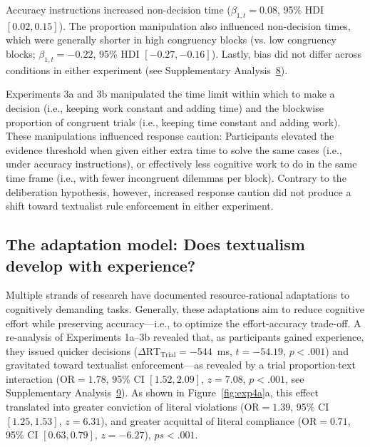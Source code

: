 \documentclass[pdflatex,sn-nature]{sn-jnl}
\begin{document}
Accuracy instructions increased non-decision time ($\beta_{1,t} = 0.08$, 95\% HDI $[0.02, 0.15]$). The proportion manipulation also influenced non-decision times, which were generally shorter in high congruency blocks (vs. low congruency blocks; $\beta_{1,t} = -0.22$, 95\% HDI $[-0.27, -0.16]$). Lastly, bias did not differ across conditions in either experiment (see Supplementary Analysis~\hyperref[supp:analysis8]{8}).

Experiments 3a and 3b manipulated the time limit within which to make a decision (i.e., keeping work constant and adding time) and the blockwise proportion of congruent trials (i.e., keeping time constant and adding work). These manipulations influenced response caution: Participants elevated the evidence threshold when given either extra time to solve the same cases (i.e., under accuracy instructions), or effectively less cognitive work to do in the same time frame (i.e., with fewer incongruent dilemmas per block). Contrary to the deliberation hypothesis, however, increased response caution did not produce a shift toward textualist rule enforcement in either experiment.

\subsection{The adaptation model: Does textualism develop with experience?}\label{subsec:adaptation}

Multiple strands of research have documented resource-rational adaptations to cognitively demanding tasks\cite{ref20,ref21,ref22}. Generally, these adaptations aim to reduce cognitive effort while preserving accuracy---i.e., to optimize the effort-accuracy trade-off. A re-analysis of Experiments 1a--3b revealed that, as participants gained experience, they issued quicker decisions ($\Delta\mathrm{RT_{Trial}} = -544$~ms, $t = -54.19$, $p < .001$) and gravitated toward textualist enforcement---as revealed by a trial proportion$\cdot$text interaction ($\mathrm{OR}= 1.78$, 95\% CI $[1.52, 2.09]$, $z = 7.08$, $p < .001$, see Supplementary Analysis~\hyperref[supp:analysis9]{9}). As shown in Figure~\ref{fig:exp4a}a, this effect translated into greater conviction of literal violations ($\mathrm{OR}= 1.39$, 95\% CI $[1.25, 1.53]$, $z = 6.31$), and greater acquittal of literal compliance ($\mathrm{OR}= 0.71$, 95\% CI $[0.63, 0.79]$, $z = -6.27$), $ps < .001$.
\end{document}
